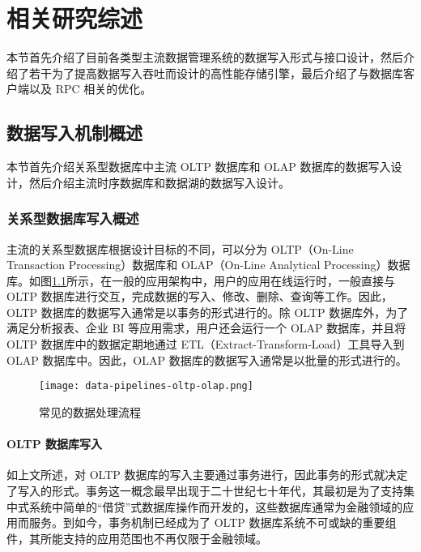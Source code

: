 
\chapter{相关研究综述}
本节首先介绍了目前各类型主流数据管理系统的数据写入形式与接口设计，然后介绍了若干为了提高数据写入吞吐而设计的高性能存储引擎，最后介绍了与数据库客户端以及 RPC 相关的优化。
\section{数据写入机制概述}
本节首先介绍关系型数据库中主流 OLTP 数据库和 OLAP 数据库的数据写入设计，然后介绍主流时序数据库和数据湖的数据写入设计。
\subsection{关系型数据库写入概述}
主流的关系型数据库根据设计目标的不同，可以分为 OLTP（On-Line Transaction Processing）数据库和 OLAP（On-Line Analytical Processing）数据库\cite{silberschatz2011database}。如图\ref{fig:data-pipelines-oltp-olap}所示，在一般的应用架构中，用户的应用在线运行时，一般直接与 OLTP 数据库进行交互，完成数据的写入、修改、删除、查询等工作。因此，OLTP 数据库的数据写入通常是以事务的形式进行的。除 OLTP 数据库外，为了满足分析报表、企业 BI 等应用需求，用户还会运行一个 OLAP 数据库，并且将 OLTP 数据库中的数据定期地通过 ETL（Extract-Transform-Load）工具导入到 OLAP 数据库中。因此，OLAP 数据库的数据写入通常是以批量的形式进行的。
\begin{figure}
  \centering
  \texttt{[image: data-pipelines-oltp-olap.png]}
  \caption{常见的数据处理流程}
  \label{fig:data-pipelines-oltp-olap}
\end{figure}

\subsubsection{OLTP 数据库写入}
如上文所述，对 OLTP 数据库的写入主要通过事务进行，因此事务的形式就决定了写入的形式。事务这一概念最早出现于二十世纪七十年代，其最初是为了支持集中式系统中简单的“借贷”式数据库操作而开发的，这些数据库通常为金融领域的应用而服务\cite{wang2008survey}。到如今，事务机制已经成为了 OLTP 数据库系统不可或缺的重要组件，其所能支持的应用范围也不再仅限于金融领域。


